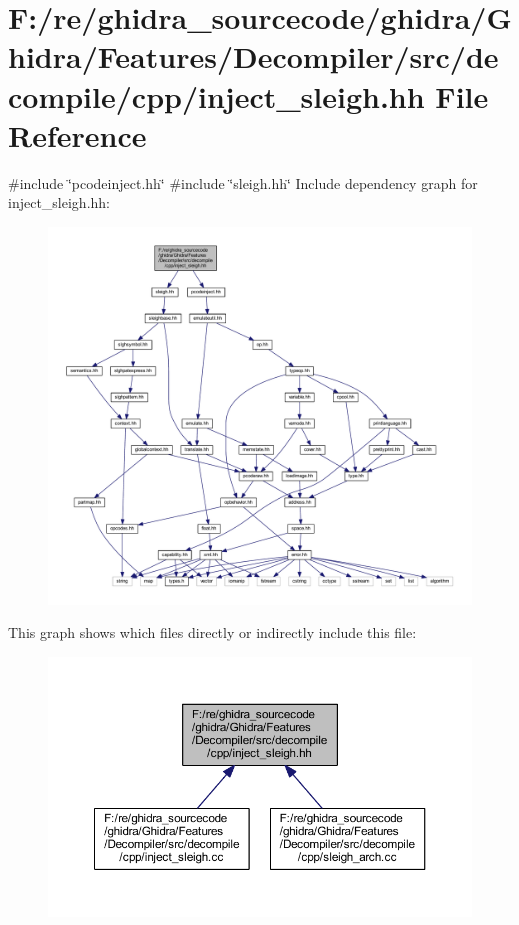 \hypertarget{inject__sleigh_8hh}{}\section{F\+:/re/ghidra\+\_\+sourcecode/ghidra/\+Ghidra/\+Features/\+Decompiler/src/decompile/cpp/inject\+\_\+sleigh.hh File Reference}
\label{inject__sleigh_8hh}
{\ttfamily \#include \char`\"{}pcodeinject.\+hh\char`\"{}}\newline
{\ttfamily \#include \char`\"{}sleigh.\+hh\char`\"{}}\newline
Include dependency graph for inject\+\_\+sleigh.\+hh\+:
\nopagebreak
\begin{figure}[H]
\begin{center}
\leavevmode
\includegraphics[width=350pt]{inject__sleigh_8hh__incl}
\end{center}
\end{figure}
This graph shows which files directly or indirectly include this file\+:
\nopagebreak
\begin{figure}[H]
\begin{center}
\leavevmode
\includegraphics[width=350pt]{inject__sleigh_8hh__dep__incl}
\end{center}
\end{figure}
